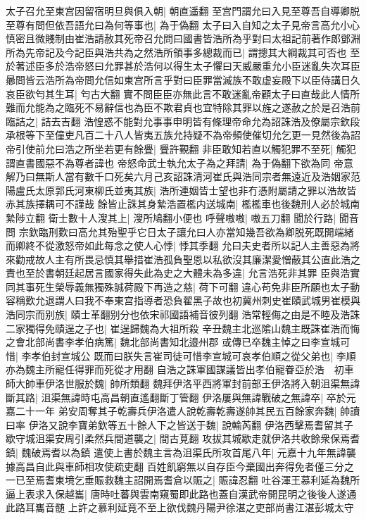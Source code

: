 太子召允至東宫因留宿明旦與俱入朝|{
	朝直遥翻}
至宫門謂允曰入見至尊吾自導卿脱至尊有問但依吾語允曰為何等事也|{
	為于偽翻}
太子曰入自知之太子見帝言高允小心慎密且微賤制由崔浩請赦其死帝召允問曰國書皆浩所為乎對曰太祖記前著作郎鄧淵所為先帝記及今記臣與浩共為之然浩所領事多總裁而已|{
	謂摠其大綱裁其可否也}
至於著述臣多於浩帝怒曰允罪甚於浩何以得生太子懼曰天威嚴重允小臣迷亂失次耳臣曏問皆云浩所為帝問允信如東宫所言乎對曰臣罪當滅族不敢虚妄殿下以臣侍講日久哀臣欲匄其生耳|{
	匄古大翻}
實不問臣臣亦無此言不敢迷亂帝顧太子曰直哉此人情所難而允能為之臨死不易辭信也為臣不欺君貞也宜特除其罪以旌之遂赦之於是召浩前臨詰之|{
	詰去吉翻}
浩惶惑不能對允事事申明皆有條理帝命允為詔誅浩及僚屬宗欽段承根等下至僮吏凡百二十八人皆夷五族允持疑不為帝頻使催切允乞更一見然後為詔帝引使前允曰浩之所坐若更有餘舋|{
	舋許覲翻}
非臣敢知若直以觸犯罪不至死|{
	觸犯謂直書國惡不為尊者諱也}
帝怒命武士執允太子為之拜請|{
	為于偽翻下欲為同}
帝意解乃曰無斯人當有數千口死矣六月己亥詔誅清河崔氏與浩同宗者無遠近及浩姻家范陽盧氏太原郭氏河東柳氏並夷其族|{
	浩所連姻皆士望也非冇憑附屬請之罪以浩故皆赤其族擇耦可不謹哉}
餘皆止誅其身縶浩置檻内送城南|{
	檻檻車也後魏刑人必於城南縶陟立翻}
衛士數十人溲其上|{
	溲所鳩翻小便也}
呼聲嗷嗷|{
	嗷五刀翻}
聞於行路|{
	聞音問}
宗欽臨刑歎曰高允其殆聖乎它日太子讓允曰人亦當知幾吾欲為卿脱死既開端緒而卿終不從激怒帝如此每念之使人心悸|{
	悸其季翻}
允曰夫史者所以記人主善惡為將來勸戒故人主有所畏忌慎其舉措崔浩孤負聖恩以私欲沒其廉潔愛憎蔽其公直此浩之責也至於書朝廷起居言國家得失此為史之大體未為多違|{
	允言浩死非其罪}
臣與浩實同其事死生榮辱義無獨殊誠荷殿下再造之慈|{
	荷下可翻}
違心苟免非臣所願也太子動容稱歎允退謂人曰我不奉東宫指導者恐負翟黑子故也初冀州刺史崔賾武城男崔模與浩同宗而别族|{
	賾士革翻别分也依宋祁國語補音彼列翻}
浩常輕侮之由是不睦及浩誅二家獨得免賾逞之子也|{
	崔逞歸魏為大祖所殺}
辛丑魏主北巡隂山魏主既誅崔浩而悔之會北部尚書李孝伯病篤|{
	魏北部尚書知北邉州郡}
或傳已卒魏主悼之曰李宣城可惜|{
	李孝伯封宣城公}
既而曰朕失言崔司徒可惜李宣城可哀孝伯順之從父弟也|{
	李順亦為魏主所寵任得罪而死從才用翻}
自浩之誅軍國謀議皆出孝伯寵眷亞於浩　初車師大帥車伊洛世服於魏|{
	帥所類翻}
魏拜伊洛平西將軍封前部王伊洛將入朝沮渠無諱斷其路|{
	沮渠無諱時屯高昌朝直遙翻斷丁管翻}
伊洛屢與無諱戰破之無諱卒|{
	卒於元嘉二十一年}
弟安周奪其子乾壽兵伊洛遣人說乾壽乾壽遂帥其民五百餘家奔魏|{
	帥讀曰率}
伊洛又說李寶弟欽等五十餘人下之皆送于魏|{
	說輸芮翻}
伊洛西擊焉耆留其子歇守城沮渠安周引柔然兵間道襲之|{
	間古莧翻}
攻拔其城歇走就伊洛共收餘衆保焉耆鎮|{
	魏破焉耆以為鎮}
遣使上書於魏主言為沮渠氏所攻首尾八年|{
	元嘉十九年無諱襲據高昌自此與車師相攻使疏吏翻}
百姓飢窮無以自存臣今棄國出奔得免者僅三分之一已至焉耆東境乞垂賑救魏主詔開焉耆倉以賑之|{
	賑諱忍翻}
吐谷渾王慕利延為魏所逼上表求入保越巂|{
	唐時吐蕃與雲南窺蜀即此路也蓋自漢武帝開昆明之後後人遂通此路耳巂音髄}
上許之慕利延竟不至上欲伐魏丹陽尹徐湛之吏部尚書江湛彭城太守

